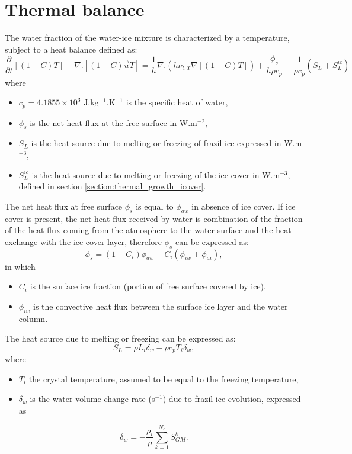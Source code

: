 \section{Thermal balance}
\label{thermal_balance}

The water fraction of the water-ice mixture is characterized
by a temperature, subject to a heat balance defined as:
\begin{equation}
\frac{\partial }{\partial t} \left[ (1-C)T \right]  + \nabla. \left[ (1-C) \vec{u} T \right]  = \dfrac{1}{h}  \nabla .(h \nu_{t,T} \nabla \left[ (1-C) T \right] ) +\frac{\phi_s }{h \rho c_{p}} - \frac{1}{\rho c_{p}}( S_{L} + S^{ic}_L)
\label{eq:model:temperature_water_phase}
\end{equation}
where
\begin{itemize}
	\item $c_{p}= 4.1855 \times 10^3$ J.kg$^{-1}$.K$^{-1}$ is the specific heat of water,
	\item $\phi_s$ is the net heat flux at the free surface in W.m$^{-2}$,
	\item $S_{L}$ is the heat source due to melting or freezing of frazil ice expressed in W.m$^{-3}$,
	\item $S^{ic}_{L}$ is the heat source due to melting or freezing of the ice cover in W.m$^{-3}$, defined in section \ref{section:thermal_growth_icover}.
\end{itemize}

The net heat flux at free surface $\phi_s$ is equal to $\phi_{aw}$ in absence of ice cover.
If ice cover is present, the net heat flux received by water is combination of the fraction of
the heat flux coming from the atmosphere to the water surface and the heat exchange with the ice cover layer,
therefore $\phi_s$ can be expressed as:
\begin{equation}\label{heat_fluxes_water}
\phi_s = (1-C_i) \phi_{aw} + C_i (\phi_{iw} + \phi_{ai}),
\end{equation}
in which
\begin{itemize}
	\item $C_i$ is the surface ice fraction (portion of free surface covered by ice),
	\item $\phi_{iw}$ is the convective heat flux between the surface ice layer and the water column.
\end{itemize}
The heat source due to melting or freezing can be expressed as:
\begin{equation}
S_{L}= \rho L_i \delta_w - \rho c_p T_i \delta_w,
\end{equation}
where
\begin{itemize}
	\item $T_i$ the crystal temperature, assumed to be equal to the freezing temperature,
	\item $\delta_w$ is the water volume change rate (s$^{-1}$) due to frazil ice evolution,  expressed as
\end{itemize}
\begin{equation}
\delta_w = - \frac{\rho_i}{\rho} \sum_{k=1}^{N_c} S^k_{GM}.
\label{eq:dw}
\end{equation}

